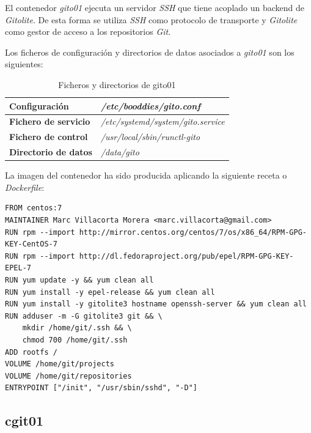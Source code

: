 \documentclass[a4paper,12pt,spanish,final]{epsc_tfc_pfc}
\begin{document}
El contenedor \emph{gito01} ejecuta un servidor \emph{SSH} que tiene acoplado un backend de \emph{Gitolite}. De esta forma se utiliza \emph{SSH} como protocolo de transporte y \emph{Gitolite} como gestor de acceso a los repositorios \emph{Git}.

Los ficheros de configuración y directorios de datos asociados a \emph{gito01} son los siguientes:
\begin{table}[h]

  \centering

  \begin{tabular}{ll}
    \toprule
    \textbf{Configuración}        & \textit{/etc/booddies/gito.conf}          \\
    \midrule
    \rowcolor[HTML]{EFEFEF}
    \textbf{Fichero de servicio}  & \textit{/etc/systemd/system/gito.service} \\
    \midrule
    \textbf{Fichero de control}   & \textit{/usr/local/sbin/runctl-gito}      \\
    \midrule
    \rowcolor[HTML]{EFEFEF}
    \textbf{Directorio de datos}  & \textit{/data/gito}                       \\
    \bottomrule
  \end{tabular}

  \caption{Ficheros y directorios de gito01}

\end{table}

La imagen del contenedor ha sido producida aplicando la siguiente receta o \emph{Dockerfile}:\\

\begin{lstlisting}[style=dnsmasq]
FROM centos:7
MAINTAINER Marc Villacorta Morera <marc.villacorta@gmail.com>
RUN rpm --import http://mirror.centos.org/centos/7/os/x86_64/RPM-GPG-KEY-CentOS-7
RUN rpm --import http://dl.fedoraproject.org/pub/epel/RPM-GPG-KEY-EPEL-7
RUN yum update -y && yum clean all
RUN yum install -y epel-release && yum clean all
RUN yum install -y gitolite3 hostname openssh-server && yum clean all
RUN adduser -m -G gitolite3 git && \
    mkdir /home/git/.ssh && \
    chmod 700 /home/git/.ssh
ADD rootfs /
VOLUME /home/git/projects
VOLUME /home/git/repositories
ENTRYPOINT ["/init", "/usr/sbin/sshd", "-D"]
\end{lstlisting}

\subsection{cgit01}
\end{document}
